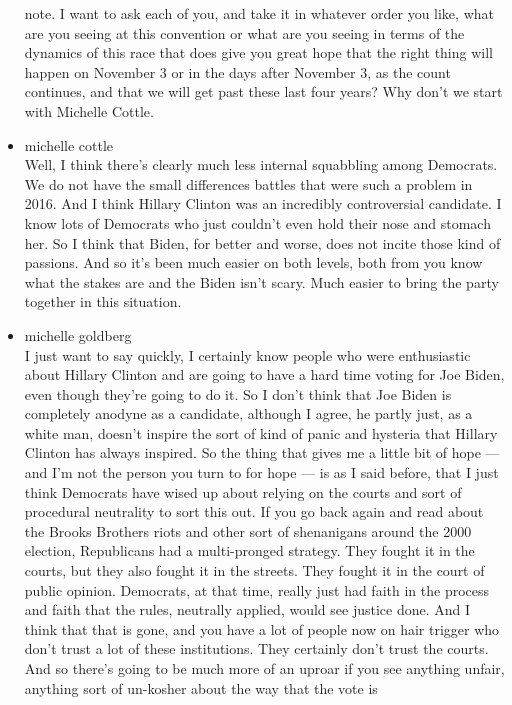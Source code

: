 \begin{itemize}
  note. I want to ask each of you, and take it in whatever order you
  like, what are you seeing at this convention or what are you seeing in
  terms of the dynamics of this race that does give you great hope that
  the right thing will happen on November 3 or in the days after
  November 3, as the count continues, and that we will get past these
  last four years? Why don't we start with Michelle Cottle.
\item
  michelle cottle\\
  Well, I think there's clearly much less internal squabbling among
  Democrats. We do not have the small differences battles that were such
  a problem in 2016. And I think Hillary Clinton was an incredibly
  controversial candidate. I know lots of Democrats who just couldn't
  even hold their nose and stomach her. So I think that Biden, for
  better and worse, does not incite those kind of passions. And so it's
  been much easier on both levels, both from you know what the stakes
  are and the Biden isn't scary. Much easier to bring the party together
  in this situation.
\item
  michelle goldberg\\
  I just want to say quickly, I certainly know people who were
  enthusiastic about Hillary Clinton and are going to have a hard time
  voting for Joe Biden, even though they're going to do it. So I don't
  think that Joe Biden is completely anodyne as a candidate, although I
  agree, he partly just, as a white man, doesn't inspire the sort of
  kind of panic and hysteria that Hillary Clinton has always inspired.
  So the thing that gives me a little bit of hope --- and I'm not the
  person you turn to for hope --- is as I said before, that I just think
  Democrats have wised up about relying on the courts and sort of
  procedural neutrality to sort this out. If you go back again and read
  about the Brooks Brothers riots and other sort of shenanigans around
  the 2000 election, Republicans had a multi-pronged strategy. They
  fought it in the courts, but they also fought it in the streets. They
  fought it in the court of public opinion. Democrats, at that time,
  really just had faith in the process and faith that the rules,
  neutrally applied, would see justice done. And I think that that is
  gone, and you have a lot of people now on hair trigger who don't trust
  a lot of these institutions. They certainly don't trust the courts.
  And so there's going to be much more of an uproar if you see anything
  unfair, anything sort of un-kosher about the way that the vote is

\end{itemize}
